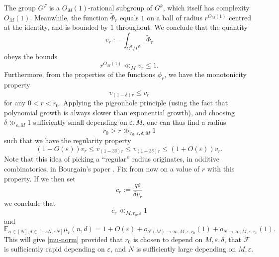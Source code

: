 \documentclass[11pt,reqno]{amsart}
\numberwithin{equation}{section}
\theoremstyle{plain}
\theoremstyle{definition}
\renewcommand{\leq}{\leqslant}
\newcommand\E{{\mathbb{E}}}
\newcommand\1{{\bf 1}}
\newcommand\2{{\bf 2}}
\newcommand\eps{\varepsilon}
\newcommand\Grow{{\mathcal F}}
\begin{document}
The group $G^{\Psi}$ is a $O_M(1)$-rational subgroup of $G^k$, which itself has complexity $O_M(1)$.  Meanwhile, the function $\tilde \Phi_r$ equals $1$ on a ball of radius $r^{O_M(1)}$ centred at the identity, and is bounded by $1$ throughout.  We conclude that the quantity
$$ v_r := \int_{G^{\Psi}/\Gamma^{\Psi}} \tilde \Phi_r $$
obeys the bounds
$$ r^{O_M(1)} \ll_M v_r \leq 1.$$
Furthermore, from the properties of the functions $\phi_r$, we have the monotonicity property
$$ v_{(1-\delta)r} \leq v_r$$
for any $0 < r < r_0$.  Applying the pigeonhole principle (using the fact that polynomial growth is always slower than exponential growth), and choosing $\delta \gg_{\eps,M} 1$ sufficiently small depending on $\eps, M$, one can thus find a radius 
$$r_0 > r \gg_{r_0,\eps,\delta,M} 1$$
such that we have the regularity property
\begin{equation}\label{vr-stable}
 (1-O(\eps)) v_r \leq v_{(1-3\delta)r} \leq v_{(1+3\delta)r} \leq (1+O(\eps)) v_r.
\end{equation}
Note that this idea of picking a ``regular'' radius originates, in additive combinatorics, in Bourgain's paper \cite{bourgain-triples}. Fix from now on a value of $r$ with this property.  If we then set
\begin{equation}\label{camera-2}
c_r := \frac{q\eps}{\delta v_r}
\end{equation}
we conclude that
\begin{equation}\label{camera}
 c_r \ll_{M,r_0,\eps} 1
\end{equation}
and
$$ \E_{n \in [N], d \in [-\eps N, \eps N]} \mu_r(n,d) = 1 + O(\eps) + 
o_{\Grow(M) \to \infty; M,\eps,r_0}(1) + o_{N \to \infty; M,\eps,r_0}(1).$$
This will give \eqref{mu-norm} provided that $r_0$ is chosen to depend on $M, \eps, \delta$, that $\Grow$ is sufficiently rapid depending on $\eps$, and $N$ is sufficiently large depending on $M, \eps$.
\end{document}
